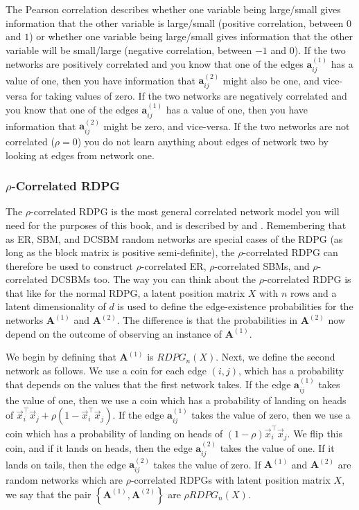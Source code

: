 The Pearson correlation describes whether one variable being large/small gives information that the other variable is large/small (positive correlation, between $0$ and $1$) or whether one variable being large/small gives information that the other variable will be small/large (negative correlation, between $-1$ and $0$). If the two networks are positively correlated and you know that one of the edges $\mathbf a_{ij}^{(1)}$ has a value of one, then you have information that $\mathbf a_{ij}^{(2)}$ might also be one, and vice-versa for taking values of zero. If the two networks are negatively correlated and you know that one of the edges $\mathbf a_{ij}^{(1)}$ has a value of one, then you have information that $\mathbf a_{ij}^{(2)}$ might be zero, and vice-versa. If the two networks are not correlated ($\rho = 0$) you do not learn anything about edges of network two by looking at edges from network one.

\subsubsection{$\rho$-Correlated RDPG}
\label{sec:ch5:multi:corr:rrdpg}

The $\rho$-correlated RDPG is the most general correlated network model you will need for the purposes of this book, and is described by \cite{Lyzinski2014Jan} and \cite{Pantazis2022}. Remembering that as ER, SBM, and DCSBM random networks are special cases of the RDPG (as long as the block matrix is positive semi-definite), the $\rho$-correlated RDPG can therefore be used to construct $\rho$-correlated ER, $\rho$-correlated SBMs, and $\rho$-correlated DCSBMs too. The way you can think about the $\rho$-correlated RDPG is that like for the normal RDPG, a latent position matrix $X$ with $n$ rows and a latent dimensionality of $d$ is used to define the edge-existence probabilities for the networks $\mathbf A^{(1)}$ and $\mathbf A^{(2)}$. The difference is that the probabilities in $\mathbf A^{(2)}$ now depend on the outcome of observing an instance of $\mathbf A^{(1)}$.

We begin by defining that $\mathbf A^{(1)}$ is $RDPG_n(X)$. Next, we define the second network as follows. We use a coin for each edge $(i, j)$, which has a probability that depends on the values that the first network takes. If the edge $\mathbf a_{ij}^{(1)}$ takes the value of one, then we use a coin which has a probability of landing on heads of $\vec x_i^\top \vec x_j + \rho(1 - \vec x_i^\top \vec x_j)$. If the edge $\mathbf a_{ij}^{(1)}$ takes the value of zero, then we use a coin which has a probability of landing on heads of $(1 - \rho)\vec x_i^\top \vec x_j$. We flip this coin, and if it lands on heads, then the edge $\mathbf a_{ij}^{(2)}$ takes the value of one. If it lands on tails, then the edge $\mathbf a_{ij}^{(2)}$ takes the value of zero. If $\mathbf A^{(1)}$ and $\mathbf A^{(2)}$ are random networks which are $\rho$-correlated RDPGs with latent position matrix $X$, we say that the pair $\left\{\mathbf A^{(1)}, \mathbf A^{(2)}\right\}$ are $\rho RDPG_n(X)$. 



